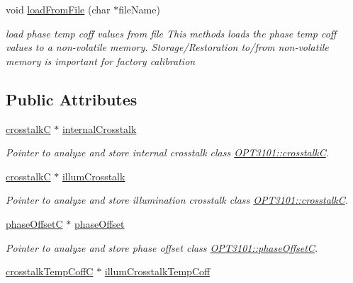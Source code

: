 \begin{DoxyCompactItemize}
void \mbox{\hyperlink{class_o_p_t3101_1_1calibration_c_aa84c53e8568557e5f12819c6736d5b37}{load\+From\+File}} (char $\ast$file\+Name)
\begin{DoxyCompactList}\small\item\em load phase temp coff values from file This methods loads the phase temp coff values to a non-\/volatile memory. Storage/\+Restoration to/from non-\/volatile memory is important for factory calibration \end{DoxyCompactList}\end{DoxyCompactItemize}
\subsection*{Public Attributes}
\begin{DoxyCompactItemize}
\item 
\mbox{\hyperlink{class_o_p_t3101_1_1crosstalk_c}{crosstalkC}} $\ast$ \mbox{\hyperlink{class_o_p_t3101_1_1calibration_c_a4df5b876541e9b33eadf6290fe08b7e5}{internal\+Crosstalk}}
\begin{DoxyCompactList}\small\item\em Pointer to analyze and store internal crosstalk class \mbox{\hyperlink{class_o_p_t3101_1_1crosstalk_c}{O\+P\+T3101\+::crosstalkC}}. \end{DoxyCompactList}\item 
\mbox{\hyperlink{class_o_p_t3101_1_1crosstalk_c}{crosstalkC}} $\ast$ \mbox{\hyperlink{class_o_p_t3101_1_1calibration_c_ac09121c7057093506de63d6e2ea3a4b7}{illum\+Crosstalk}}
\begin{DoxyCompactList}\small\item\em Pointer to analyze and store illumination crosstalk class \mbox{\hyperlink{class_o_p_t3101_1_1crosstalk_c}{O\+P\+T3101\+::crosstalkC}}. \end{DoxyCompactList}\item 
\mbox{\hyperlink{class_o_p_t3101_1_1phase_offset_c}{phase\+OffsetC}} $\ast$ \mbox{\hyperlink{class_o_p_t3101_1_1calibration_c_a06f6a097057b9ed8f4914f4027d709c1}{phase\+Offset}}
\begin{DoxyCompactList}\small\item\em Pointer to analyze and store phase offset class \mbox{\hyperlink{class_o_p_t3101_1_1phase_offset_c}{O\+P\+T3101\+::phase\+OffsetC}}. \end{DoxyCompactList}\item 
\mbox{\hyperlink{class_o_p_t3101_1_1crosstalk_temp_coff_c}{crosstalk\+Temp\+CoffC}} $\ast$ \mbox{\hyperlink{class_o_p_t3101_1_1calibration_c_ac7bcc22317965bb378479fb016c20d3c}{illum\+Crosstalk\+Temp\+Coff}}

\end{DoxyCompactItemize}
